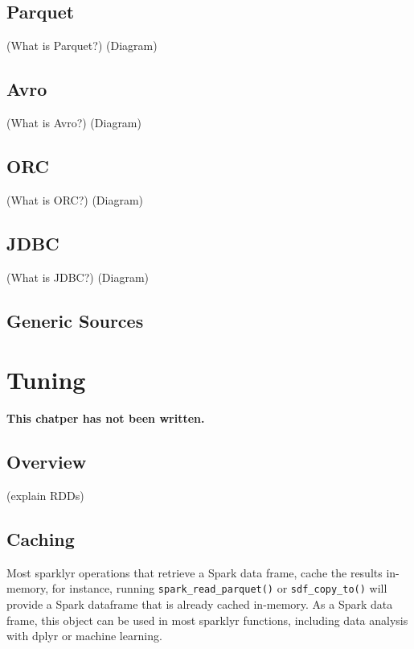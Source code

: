 \documentclass[]{book}
\theoremstyle{definition}
\theoremstyle{definition}
\theoremstyle{definition}
\theoremstyle{remark}
\begin{document}
\hypertarget{parquet}{%
\section{Parquet}\label{parquet}}

(What is Parquet?) (Diagram)

\hypertarget{avro}{%
\section{Avro}\label{avro}}

(What is Avro?) (Diagram)

\hypertarget{orc}{%
\section{ORC}\label{orc}}

(What is ORC?) (Diagram)

\hypertarget{jdbc}{%
\section{JDBC}\label{jdbc}}

(What is JDBC?) (Diagram)

\hypertarget{generic-sources}{%
\section{Generic Sources}\label{generic-sources}}

\hypertarget{tuning}{%
\chapter{Tuning}\label{tuning}}

\textbf{This chatper has not been written.}

\hypertarget{overview-4}{%
\section{Overview}\label{overview-4}}

(explain RDDs)

\hypertarget{caching}{%
\section{Caching}\label{caching}}

Most sparklyr operations that retrieve a Spark data frame, cache the
results in-memory, for instance, running \texttt{spark\_read\_parquet()}
or \texttt{sdf\_copy\_to()} will provide a Spark dataframe that is
already cached in-memory. As a Spark data frame, this object can be used
in most sparklyr functions, including data analysis with dplyr or
machine learning.
\end{document}
